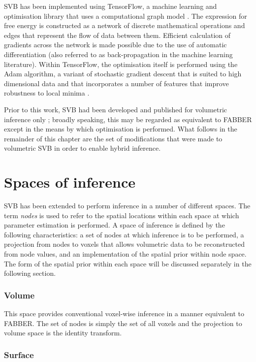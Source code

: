 SVB has been implemented using TensorFlow, a machine learning and optimisation library that uses a computational graph model \cite{abadi2016}. The expression for free energy is constructed as a network of discrete mathematical operations and edges that represent the flow of data between them. Efficient calculation of gradients across the network is made possible due to the use of automatic differentiation (also referred to as back-propagation in the machine learning literature). Within TensorFlow, the optimisation itself is performed using the Adam algorithm, a variant of stochastic gradient descent that is suited to high dimensional data and that incorporates a number of features that improve robustness to local minima \cite{Bottou2010, adam_optimisation}. 

Prior to this work, SVB had been developed and published for volumetric inference only \cite{chappellSVB, chappell2020fmrib}; broadly speaking, this may be regarded as equivalent to FABBER except in the means by which optimisation is performed. What follows in the remainder of this chapter are the set of modifications that were made to volumetric SVB in order to enable hybrid inference. 

\section{Spaces of inference}

SVB has been extended to perform inference in a number of different spaces. The term \textit{nodes} is used to refer to the spatial locations within each space at which parameter estimation is performed. A space of inference is defined by the following characteristics: a set of nodes at which inference is to be performed, a projection from nodes to voxels that allows volumetric data to be reconstructed from node values, and an implementation of the spatial prior within node space. The form of the spatial prior within each space will be discussed separately in the following section. 

\subsubsection{Volume}

This space provides conventional voxel-wise inference in a manner equivalent to FABBER. The set of nodes is simply the set of all voxels and the projection to volume space is the identity transform.  

\subsubsection{Surface}

